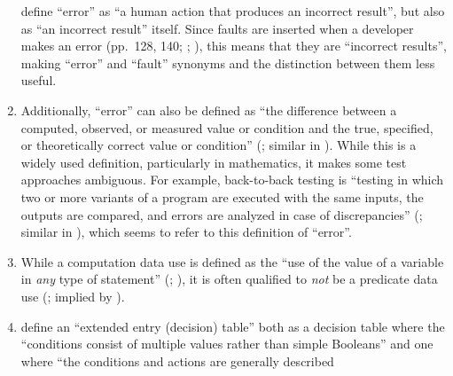 \begin{enumerate}
          \citet[p.~128]{IEEE2010} define
          ``error'' as ``a human action that produces an incorrect result'',
          but also as ``an incorrect result'' itself. Since faults are inserted
          when a developer makes an error %
          (pp.~128, 140; \citealp[p.~12\=/3]{SWEBOK2024};
          \citealp[pp.~399\==400]{vanVliet2000}), this means that they are
          ``incorrect results'', making ``error'' and ``fault'' synonyms%
           and
          the distinction between them less useful.
    \item %
          Additionally, ``error'' can also be defined as ``the
          difference between a computed, observed, or measured value or
          condition and the true, specified, or theoretically correct value
          or condition'' (\citealp[p.~128]{IEEE2010}; similar in
          \citealp[pp.~17\=/18 to 17\=/19, 18\=/7 to 18\=/8]{SWEBOK2024}).
          While this is a widely used definition, particularly in mathematics,
          it makes some test approaches ambiguous.
          For example, back-to-back
          testing is ``testing in which two or more variants of a program are
          executed with the same inputs, the outputs are compared, and errors
          are analyzed in case of discrepancies'' (\citealp[p.~30]{IEEE2010};
          similar in \citealpISTQB{}), which seems to refer to this definition
          of ``error''.
    \item %
          While a computation data use is defined as the ``use of the value of a
          variable in \emph{any} type of statement'' (\citealp[p.~2]{IEEE2021c};
          \citeyear[p.~83, emphasis added]{IEEE2017}), it is
          often qualified to \emph{not} be a predicate data use
          (\citealp[p.~424]{vanVliet2000}; implied by \citealp[p.~27]{IEEE2021c}).
    \item %
          \citeauthor{IEEE2021c} define an ``extended entry (decision) table''
          both as a decision table where the ``conditions consist of multiple
          values rather than simple Booleans'' \citeyearpar[p.~18]{IEEE2021c}
          and one where ``the conditions and actions are generally described

\end{enumerate}
